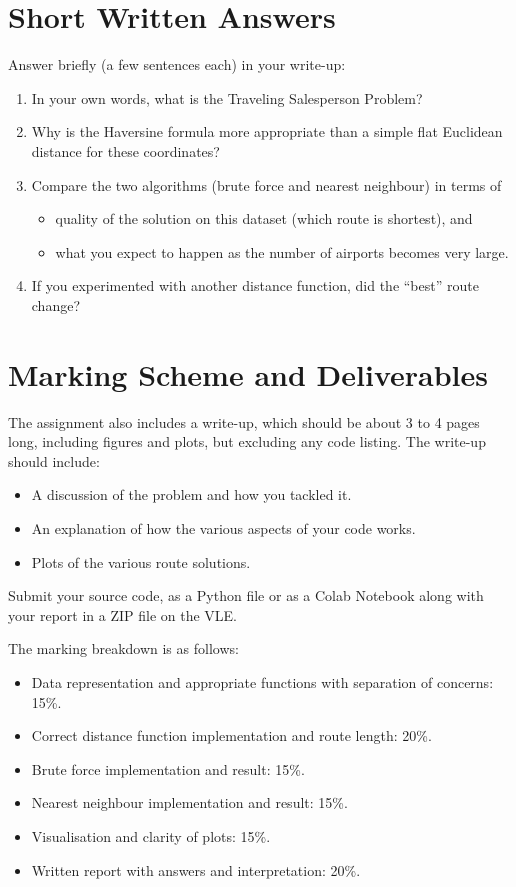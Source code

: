 \documentclass[11pt]{article}
\begin{document}
\section{Short Written Answers}
Answer briefly (a few sentences each) in your write-up:
\begin{enumerate}
    \item In your own words, what is the Traveling Salesperson Problem?
    \item Why is the Haversine formula more appropriate than a simple flat Euclidean distance for these coordinates?
    \item Compare the two algorithms (brute force and nearest neighbour) in terms of
    \begin{itemize}
        \item quality of the solution on this dataset (which route is shortest), and
        \item what you expect to happen as the number of airports becomes very large.
    \end{itemize}
    \item If you experimented with another distance function, did the ``best'' route change?
\end{enumerate}

\section{Marking Scheme and Deliverables}
The assignment also includes a write-up, which should be about 3 to 4 pages long, including figures and plots, but excluding any code listing. The write-up should include:
\begin{itemize}
    \item A discussion of the problem and how you tackled it.
    \item An explanation of how the various aspects of your code works.
    \item Plots of the various route solutions.
\end{itemize}
Submit your source code, as a Python file or as a Colab Notebook along with your report in a ZIP file on the VLE.

The marking breakdown is as follows:
\begin{itemize}
    \item Data representation and appropriate functions with separation of concerns: 15\%.
    \item Correct distance function implementation and route length: 20\%.
    \item Brute force implementation and result: 15\%.
    \item Nearest neighbour implementation and result: 15\%.
    \item Visualisation and clarity of plots: 15\%.
    \item Written report with answers and interpretation: 20\%.
\end{itemize}
\end{document}
